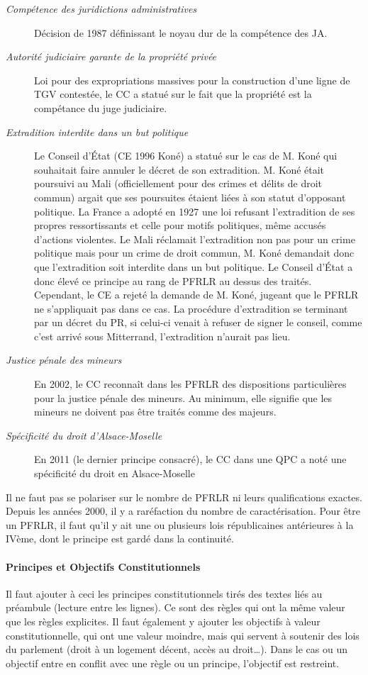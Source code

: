 \documentclass[math]{cours}
\begin{document}
\begin{description}
	\item[\emph{Compétence des juridictions administratives}] Décision de 1987 définissant le noyau dur de la compétence des JA.
	\item[\emph{Autorité judiciaire garante de la propriété privée}] Loi pour des expropriations massives pour la construction d'une ligne de TGV contestée, le CC a statué sur le fait que la propriété est la compétance du juge judiciaire.
	\item[\emph{Extradition interdite dans un but politique}] Le Conseil d'État (CE 1996 Koné) a statué sur le cas de M. Koné qui souhaitait faire annuler le décret de son extradition.
	      M. Koné était poursuivi au Mali (officiellement pour des crimes et délits de droit commun) argait que ses poursuites étaient liées à son statut d'opposant politique.
	      La France a adopté en 1927 une loi refusant l'extradition de ses propres ressortissants et celle pour motifs politiques, même accusés d'actions violentes.
	      Le Mali réclamait l'extradition non pas pour un crime politique mais pour un crime de droit commun, M. Koné demandait donc que l'extradition soit interdite dans un but politique.
	      Le Conseil d'État a donc élevé ce principe au rang de PFRLR au dessus des traités.
	      Cependant, le CE a rejeté la demande de M. Koné, jugeant que le PFRLR ne s'appliquait pas dans ce cas.
	      La procédure d'extradition se terminant par un décret du PR, si celui-ci venait à refuser de signer le conseil, comme c'est arrivé sous Mitterrand, l'extradition n'aurait pas lieu.
	\item[\emph{Justice pénale des mineurs}] En 2002, le CC reconnaît dans les PFRLR des dispositions particulières pour la justice pénale des mineurs.
	      Au minimum, elle signifie que les mineurs ne doivent pas être traités comme des majeurs.
	\item[\emph{Spécificité du droit d'Alsace-Moselle}] En 2011 (le dernier principe consacré), le CC dans une QPC a noté une spécificité du droit en Alsace-Moselle
\end{description}
Il ne faut pas se polariser sur le nombre de PFRLR ni leurs qualifications exactes.
Depuis les années 2000, il y a raréfaction du nombre de caractérisation.
Pour être un PFRLR, il faut qu'il y ait une ou plusieurs lois républicaines antérieures à la IVème, dont le principe est gardé dans la continuité.

\paragraph{Principes et Objectifs Constitutionnels}
Il faut ajouter à ceci les principes constitutionnels tirés des textes liés au préambule (lecture entre les lignes).
Ce sont des règles qui ont la même valeur que les règles explicites.
Il faut également y ajouter les objectifs à valeur constitutionnelle, qui ont une valeur moindre, mais qui servent à soutenir des lois du parlement (droit à un logement décent, accès au droit\ldots).
Dans le cas ou un objectif entre en conflit avec une règle ou un principe, l'objectif est restreint.
\end{document}
